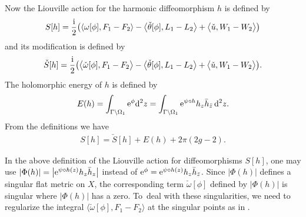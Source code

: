 \documentclass[pdftex]{sigma}%
\numberwithin{equation}{section}
\begin{document}
Now the Liouville action for the harmonic diffeomorphism $h$ is defined by
\begin{gather*}%
S[h]=\frac{\rm i}{2}\bigl(\langle {\omega}[\phi], F_1-F_2 \rangle-\big\langle\check{\theta}[\phi], L_1-L_2 \big\rangle+\big\langle \check{u}, W_1-W_2 \big\rangle\bigr)
\end{gather*}
and its modification is defined by
\begin{gather*}
\check{S}[h]=\frac{\rm i}{2}\big(\big\langle \check{\omega}[\phi], F_1-F_2 \big\rangle-\big\langle\check{\theta}[\phi], L_1-L_2 \big\rangle+\big\langle \check{u}, W_1-W_2 \big\rangle\big).
\end{gather*}
The holomorphic energy of $h$ is defined by
\begin{gather*}%
E(h) = \int_{\Gamma\backslash \Omega_1} {\rm e}^{\phi} {\rm d}^2z = \int_{\Gamma\backslash\Omega_1} {\rm e}^{\psi\circ h} h_z \bar{h}_{\bar{z}}\, {\rm d}^2z.
\end{gather*}
From the definitions we have
\begin{gather*}
S[h]=\check{S}[h]+E(h)+ 2\pi (2g-2).
\end{gather*}

\begin{Remark}\label{r:def-with-Hopf}
In the above definition of the Liouville action for diffeomorphisms $S[h]$, one may use $|\Phi(h)|=\big|{\rm e}^{\psi\circ h(z)} h_z \bar{h}_z\big|$ instead of
${\rm e}^\phi={\rm e}^{\psi \circ h(z)} h_z \bar{h}_{\bar{z}}$. Since $|\Phi(h)|$ defines a singular flat metric on $X$, the corresponding term $\check{\omega}[\phi]$ defined by $|\Phi(h)|$
is singular where $|\Phi(h)|$ has a zero.
To~deal with these singularities, we need to regularize the integral $\langle \check{\omega}[\phi], F_1-F_2 \rangle$ at the singular points as in \cite{M-P}.
\end{Remark}
\end{document}
